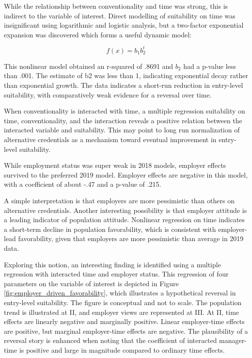 \documentclass[AER]{./aea-latex-templates/AEA}
\begin{document}
        While the relationship between conventionality and time was strong,
        this is indirect to the variable of interest. Direct modelling of suitability
        on time was insignificant using logarithmic and logistic analysis, but
        a two-factor exponential expansion was discovered which forms a useful dynamic model:
        
        \begin{equation} f(x) = b_1b_2^t \end{equation}
        
        This nonlinear model obtained an r-squared of .8691 and $b_2$ had a p-value
        less than .001. The estimate of b2 was less than 1, indicating exponential
        decay rather than exponential growth. The data indicates a short-run reduction in entry-level
        suitability, with comparatively weak evidence for a reversal over time.
        
        When conventionality is interacted with time, a multiple regression suitability on time, conventionality, and the interaction
        reveals a positive relation between the interacted variable and suitability.
        This may point to long run normalization of alternative credentials as a mechanism toward eventual improvement in entry-level suitability.
        
        While employment status was super weak in 2018 models,
        employer effects survived to the preferred 2019 model.
        Employer effects are negative in this model, with a coefficient of about -.47 and a p-value of .215.
        
        A simple interpretation is that employers are more pessimistic than others
        on alternative credentials. Another interesting possibility is that employer attitude is a leading indicator of population attitude.
        Nonlinear regression on time indicates a short-term decline in population favorability,
        which is consistent with employer-lead favorability, given that employers are more pessimistic than average in 2019 data.
        
        Exploring this notion, an interesting finding is identified using a multiple regression with interacted time and employer status.
        This regression of four parameters on the variable of interest is depicted in
        Figure \ref{fig:employer_driven_favorability}, which illustrates a hypothetical reversal in entry-level
        suitability. The figure is conceptual and not to scale. The population
        trend is illustrated at II, and employer views are represented at III. At II,
        time effects are linearly negative and marginally positive. Linear
        employer-time effects are positive, but marginal employer-time effects are
        negative. The plausibility of a reversal story is enhanced when noting
        that the coefficient of interacted manager-time is positive and large in magnitude compared to ordinary time effects.
        
\end{document}
